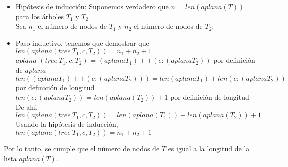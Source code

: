 \documentclass{article}
\begin{document}
\begin{enumerate}
{\begin{enumerate}
{\begin{itemize}
{                    }
					\item {
                       Hipótesis de inducción:
                       Suponemos verdadero que $n$ = $len(aplana(T))$ para los árboles $T_1$ y $T_2$\\
                                           }
                    Sea $n_1$ el número de nodos de $T_1$ y $n_2$ el número de nodos de $T_2$:
                    \item {
                        Paso inductivo, tenemos que demostrar que $len(aplana(tree \ T_1, c, T_2)) = n_1 + n_2 + 1$ \\ 
                        $aplana$ $(tree \ T_1, c, T_2)$ = $(aplana T_1) ++ (e:(aplana T_2))$ por definición de $aplana$\\
                        $len((aplana T_1) ++ (e:(aplana T_2))) = len(aplana T_1) + len(e:(aplana T_2))$ por definición de longitud\\
                        $len(e:(aplana T_2))$ = $len(aplana(T_2)) + 1$ por definición de longitud\\
                        De ahí, $len(aplana(tree \ T_1, c, T_2)) = len(aplana(T_1)) + len(aplana(T_2)) + 1 $ \\
                        Usando la hipótesis de inducción, $len(aplana(tree \ T_1, c, T_2)) = n_1 + n_2 + 1$ 
               }
                \end{itemize}
                Por lo tanto, se cumple  que el número de nodos de $T$ es igual a la longitud de la lista $aplana(T)$.
            }\\
                
            \end{enumerate}
        }
        

\end{enumerate}
\end{document}
